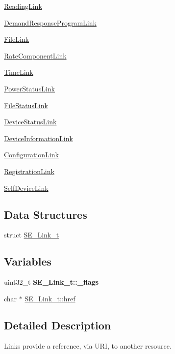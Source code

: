 \begin{DoxyCompactItemize}
\item 
\hyperlink{group__ReadingLink}{Reading\+Link}
\item 
\hyperlink{group__DemandResponseProgramLink}{Demand\+Response\+Program\+Link}
\item 
\hyperlink{group__FileLink}{File\+Link}
\item 
\hyperlink{group__RateComponentLink}{Rate\+Component\+Link}
\item 
\hyperlink{group__TimeLink}{Time\+Link}
\item 
\hyperlink{group__PowerStatusLink}{Power\+Status\+Link}
\item 
\hyperlink{group__FileStatusLink}{File\+Status\+Link}
\item 
\hyperlink{group__DeviceStatusLink}{Device\+Status\+Link}
\item 
\hyperlink{group__DeviceInformationLink}{Device\+Information\+Link}
\item 
\hyperlink{group__ConfigurationLink}{Configuration\+Link}
\item 
\hyperlink{group__RegistrationLink}{Registration\+Link}
\item 
\hyperlink{group__SelfDeviceLink}{Self\+Device\+Link}
\end{DoxyCompactItemize}
\subsection*{Data Structures}
\begin{DoxyCompactItemize}
\item 
struct \hyperlink{structSE__Link__t}{S\+E\+\_\+\+Link\+\_\+t}
\end{DoxyCompactItemize}
\subsection*{Variables}
\begin{DoxyCompactItemize}
\item 
\mbox{\label{group__Link_gac6d6ac5b8eed2fe68af273425ac836cf}} 
uint32\+\_\+t {\bfseries S\+E\+\_\+\+Link\+\_\+t\+::\+\_\+flags}
\item 
char $\ast$ \hyperlink{group__Link_ga487ebc5f492311a2f580ad81500e6cdf}{S\+E\+\_\+\+Link\+\_\+t\+::href}
\end{DoxyCompactItemize}


\subsection{Detailed Description}
Links provide a reference, via U\+RI, to another resource. 

